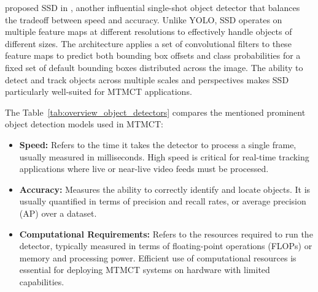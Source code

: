 \citeauthor{Liu16} proposed SSD in \citeyear{Liu16}, another influential single-shot object detector that balances the tradeoff between speed and accuracy. Unlike YOLO, SSD operates on multiple feature maps at different resolutions to effectively handle objects of different sizes. The architecture applies a set of convolutional filters to these feature maps to predict both bounding box offsets and class probabilities for a fixed set of default bounding boxes distributed across the image. The ability to detect and track objects across multiple scales and perspectives makes SSD particularly well-suited for MTMCT applications.

\begin{table}[ht]
    \centering
    \caption{Overview Object Detectors}\label{tab:overview_object_detectors}
\end{table}

The Table~\ref{tab:overview_object_detectors} compares the mentioned prominent object detection models used in MTMCT:

\begin{itemize}
    \item \textbf{Speed:} Refers to the time it takes the detector to process a single frame, usually measured in milliseconds. High speed is critical for real-time tracking applications where live or near-live video feeds must be processed.
    \item \textbf{Accuracy:} Measures the ability to correctly identify and locate objects. It is usually quantified in terms of precision and recall rates, or average precision (AP) over a dataset.
    \item \textbf{Computational Requirements:} Refers to the resources required to run the detector, typically measured in terms of floating-point operations (FLOPs) or memory and processing power. Efficient use of computational resources is essential for deploying MTMCT systems on hardware with limited capabilities.
\end{itemize}


